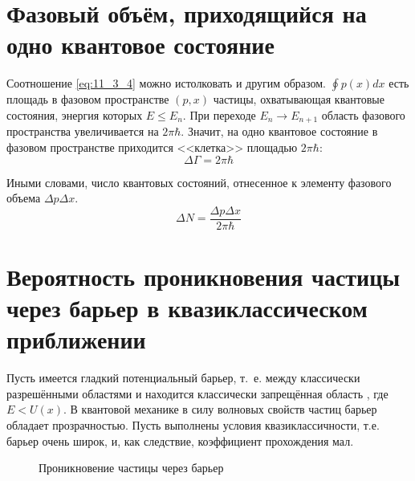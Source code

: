 \section{Фазовый объём, приходящийся на одно квантовое состояние}

Соотношение \eqref{eq:11_3_4} можно истолковать и другим образом. $\oint p(x)dx$ есть площадь в фазовом пространстве $(p,x)$ частицы, охватывающая квантовые состояния, энергия которых $E \le E_n$. При переходе $E_n \to E_{n+1}$ область фазового пространства увеличивается на $2\pi\hbar$. Значит, на одно квантовое состояние в фазовом пространстве приходится <<клетка>> площадью $2\pi \hbar$:
$$
\boxed{\Delta\Gamma = 2\pi\hbar}
$$

Иными словами, число квантовых состояний, отнесенное к элементу фазового объема $\Delta p \Delta x$.
$$
\boxed{\Delta N = \frac{\Delta p \Delta x}{2\pi\hbar}}
$$

\begin{sloppypar}
  \section{Вероятность проникновения частицы через барьер в квазиклассическом приближении}
\end{sloppypar}

Пусть имеется гладкий потенциальный барьер, т.~е. между классически разрешёнными областями  и  находится классически запрещённая область , где $E < U(x)$. В квантовой механике в силу волновых свойств частиц барьер обладает прозрачностью. Пусть выполнены условия квазиклассичности, т.е. барьер очень широк, и, как следствие, коэффициент прохождения мал. 

\begin{figure}[h]
\centering
{}
\caption{Проникновение частицы через барьер} \label{fig:11_5}
\end{figure}

